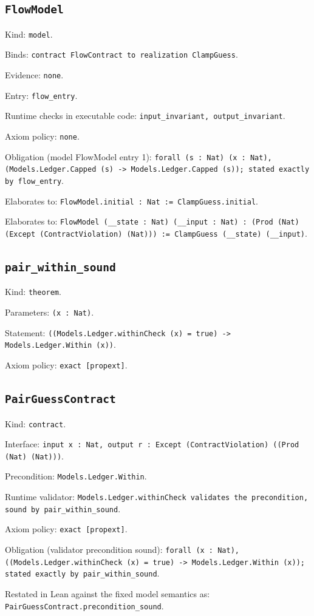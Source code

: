 \documentclass[11pt]{article}
\begin{document}
\subsection*{\texttt{FlowModel}}
\noindent Kind: \texttt{model}.\par
\noindent Binds: \texttt{contract FlowContract to realization ClampGuess}.\par
\noindent Evidence: \texttt{none}.\par
\noindent Entry: \texttt{flow\_entry}.\par
\noindent Runtime checks in executable code: \texttt{input\_invariant, output\_invariant}.\par
\noindent Axiom policy: \texttt{none}.\par
\noindent Obligation (model FlowModel entry 1): \texttt{forall (s : Nat) (x : Nat), (Models.Ledger.Capped (s) -> Models.Ledger.Capped (s)); stated exactly by flow\_entry}.\par
\noindent Elaborates to: \texttt{FlowModel.initial : Nat := ClampGuess.initial}.\par
\noindent Elaborates to: \texttt{FlowModel (\_\_state : Nat) (\_\_input : Nat) : (Prod (Nat) (Except (ContractViolation) (Nat))) := ClampGuess (\_\_state) (\_\_input)}.\par
\subsection*{\texttt{pair\_within\_sound}}
\noindent Kind: \texttt{theorem}.\par
\noindent Parameters: \texttt{(x : Nat)}.\par
\noindent Statement: \texttt{((Models.Ledger.withinCheck (x) = true) -> Models.Ledger.Within (x))}.\par
\noindent Axiom policy: \texttt{exact [propext]}.\par
\subsection*{\texttt{PairGuessContract}}
\noindent Kind: \texttt{contract}.\par
\noindent Interface: \texttt{input x : Nat, output r : Except (ContractViolation) ((Prod (Nat) (Nat)))}.\par
\noindent Precondition: \texttt{Models.Ledger.Within}.\par
\noindent Runtime validator: \texttt{Models.Ledger.withinCheck validates the precondition, sound by pair\_within\_sound}.\par
\noindent Axiom policy: \texttt{exact [propext]}.\par
\noindent Obligation (validator precondition sound): \texttt{forall (x : Nat), ((Models.Ledger.withinCheck (x) = true) -> Models.Ledger.Within (x)); stated exactly by pair\_within\_sound}.\par
\noindent Restated in Lean against the fixed model semantics as: \texttt{PairGuessContract.precondition\_sound}.\par
\end{document}
